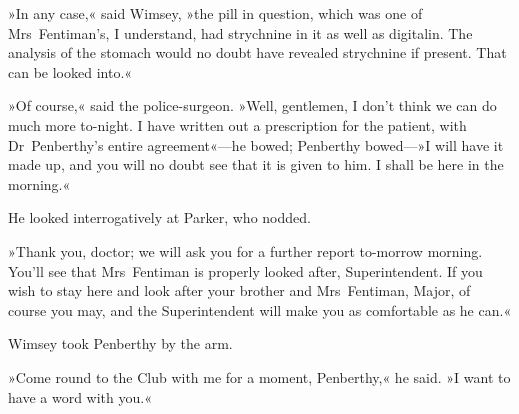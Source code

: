 »In any case,« said Wimsey, »the pill in question, which was one of Mrs~Fentiman's, I understand, had strychnine in it as well as digitalin. The analysis of the stomach would no doubt have revealed strychnine if present. That can be looked into.«

»Of course,« said the police-surgeon. »Well, gentlemen, I don't think we can do much more to-night. I have written out a prescription for the patient, with Dr~Penberthy's entire agreement«—he bowed; Penberthy bowed—»I will have it made up, and you will no doubt see that it is given to him. I shall be here in the morning.«

He looked interrogatively at Parker, who nodded.

»Thank you, doctor; we will ask you for a further report to-morrow morning. You'll see that Mrs~Fentiman is properly looked after, Superintendent. If you wish to stay here and look after your brother and Mrs~Fentiman, Major, of course you may, and the Superintendent will make you as comfortable as he can.«

Wimsey took Penberthy by the arm.

»Come round to the Club with me for a moment, Penberthy,« he said. »I want to have a word with you.«